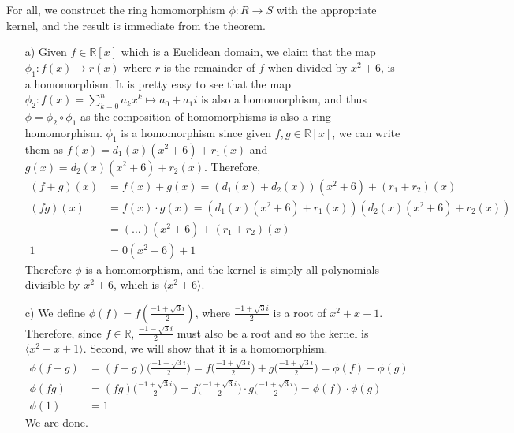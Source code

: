   \begin{solution}
    For all, we construct the ring homomorphism $\phi: R \rightarrow S$ with the appropriate kernel, and the result is immediate from the theorem.  
    \begin{enumerate}
      \item[a)] Given $f \in \mathbb{R}[x]$ which is a Euclidean domain, we claim that the map $\phi_1: f(x) \mapsto r(x)$ where $r$ is the remainder of $f$ when divided by $x^2 + 6$, is a homomorphism. It is pretty easy to see that the map $\phi_2 : f(x) = \sum_{k=0}^n a_k x^k \mapsto a_0 + a_1 i$ is also a homomorphism, and thus $\phi = \phi_2 \circ \phi_1$ as the composition of homomorphisms is also a ring homomorphism. $\phi_1$ is a homomorphism since given $f, g \in \mathbb{R}[x]$, we can write them as $f(x) = d_1(x) (x^2 + 6) + r_1 (x)$ and $g(x) = d_2 (x) (x^2 + 6) + r_2 (x)$. Therefore, 
      \begin{align}
        (f + g)(x) & = f(x) + g(x) = (d_1 (x) + d_2 (x)) (x^2 + 6) + (r_1 + r_2) (x) \\
           (fg)(x) & = f(x) \cdot g(x) = (d_1 (x) (x^2 + 6) + r_1 (x)) (d_2 (x) (x^2 + 6) + r_2 (x)) \\
                   & = (\ldots) (x^2 + 6) + (r_1 + r_2)(x) \\
        1 & = 0 (x^2 + 6) + 1
      \end{align}
      Therefore $\phi$ is a homomorphism, and the kernel is simply all polynomials divisible by $x^2 + 6$, which is $\langle x^2 + 6 \rangle$. 

      \item[c)] We define $\phi(f) = f(\frac{-1 + \sqrt{3} i}{2})$, where $\frac{-1 + \sqrt{3} i}{2}$ is a root of $x^2 + x + 1$. Therefore, since $f \in \mathbb{R}$, $\frac{-1 - \sqrt{3} i}{2}$ must also be a root and so the kernel is $\langle x^2 + x + 1 \rangle$. Second, we will show that it is a homomorphism. 
      \begin{align}
        \phi(f + g) & = (f + g) \bigg( \frac{-1 + \sqrt{3} i}{2} \bigg) = f \bigg( \frac{-1 + \sqrt{3} i}{2} \bigg) + g \bigg( \frac{-1 + \sqrt{3} i}{2} \bigg) = \phi(f) + \phi(g) \\
        \phi(fg) & = (f g) \bigg( \frac{-1 + \sqrt{3} i}{2} \bigg) = f \bigg( \frac{-1 + \sqrt{3} i}{2} \bigg) \cdot g \bigg( \frac{-1 + \sqrt{3} i}{2} \bigg) = \phi(f) \cdot \phi(g) \\ 
        \phi(1) & = 1 
      \end{align}
      We are done. 



\end{enumerate}
\end{solution}
